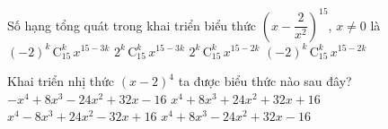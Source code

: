 	\begin{ex}%
Số hạng tổng quát trong khai triển biểu thức $\left(x-\dfrac{2}{x^2}\right)^{15}$, $x\neq 0$ là
\choice
{\True $(-2)^k\,\mathrm{C}_{15}^{k}\,x^{15-3k}$}
{$2^k\,\mathrm{C}_{15}^{k}\,x^{15-3k}$}
{$2^k\,\mathrm{C}_{15}^{k}\,x^{15-2k}$}
{$(-2)^k\,\mathrm{C}_{15}^{k}\,x^{15-2k}$}
\end{ex}
	
	\begin{ex}%
Khai triển nhị thức $(x-2)^4$ ta được biểu thức nào sau đây?
\choice
{$-x^4+8x^3-24x^2+32x-16$}
{$x^4+8x^3+24x^2+32x+16$}
{\True $x^4-8x^3+24x^2-32x+16$}
{$x^4+8x^3-24x^2+32x-16$}
\end{ex}
	
